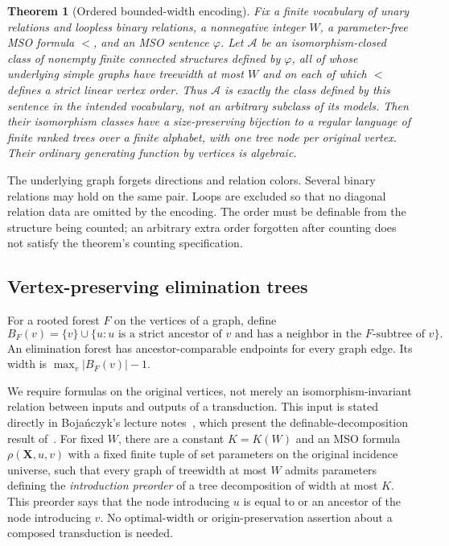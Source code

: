 \documentclass[11pt]{article}
\newtheorem{theorem}{Theorem}[section]
\theoremstyle{definition}\newtheorem{definition}[theorem]{Definition}
\theoremstyle{remark}\newtheorem{remark}[theorem]{Remark}
\begin{document}
\begin{theorem}[Ordered bounded-width encoding]\label{thm:bridge}
Fix a finite vocabulary of unary relations and loopless binary relations, a nonnegative integer $W$, a parameter-free MSO formula $<$, and an MSO sentence $\varphi$. Let $\mathcal A$ be an isomorphism-closed class of nonempty finite connected structures defined by $\varphi$, all of whose underlying simple graphs have treewidth at most $W$ and on each of which $<$ defines a strict linear vertex order. Thus $\mathcal A$ is exactly the class defined by this sentence in the intended vocabulary, not an arbitrary subclass of its models. Then their isomorphism classes have a size-preserving bijection to a regular language of finite ranked trees over a finite alphabet, with one tree node per original vertex. Their ordinary generating function by vertices is algebraic.
\end{theorem}
The underlying graph forgets directions and relation colors. Several binary relations may hold on the same pair. Loops are excluded so that no diagonal relation data are omitted by the encoding. The order must be definable from the structure being counted; an arbitrary extra order forgotten after counting does not satisfy the theorem's counting specification.

\subsection{Vertex-preserving elimination trees}
For a rooted forest $F$ on the vertices of a graph, define
\begin{equation}\label{eq:bags}
 B_F(v)=\{v\}\cup\{u:u\text{ is a strict ancestor of }v
 \text{ and has a neighbor in the }F\text{-subtree of }v\}.
\end{equation}
An elimination forest has ancestor-comparable endpoints for every graph edge. Its width is $\max_v|B_F(v)|-1$.

We require formulas on the original vertices, not merely an isomorphism-invariant relation between inputs and outputs of a transduction. This input is stated directly in Boja\'nczyk's lecture notes~\cite[Definitions 6.20--6.21 and Theorem 6.22]{Bojanczyk2020}, which present the definable-decomposition result of~\cite{BP2016}. For fixed $W$, there are a constant $K=K(W)$ and an MSO formula $\rho(\mathbf X,u,v)$ with a fixed finite tuple of set parameters on the original incidence universe, such that every graph of treewidth at most $W$ admits parameters defining the \emph{introduction preorder} of a tree decomposition of width at most $K$. This preorder says that the node introducing $u$ is equal to or an ancestor of the node introducing $v$. No optimal-width or origin-preservation assertion about a composed transduction is needed.
\end{document}
